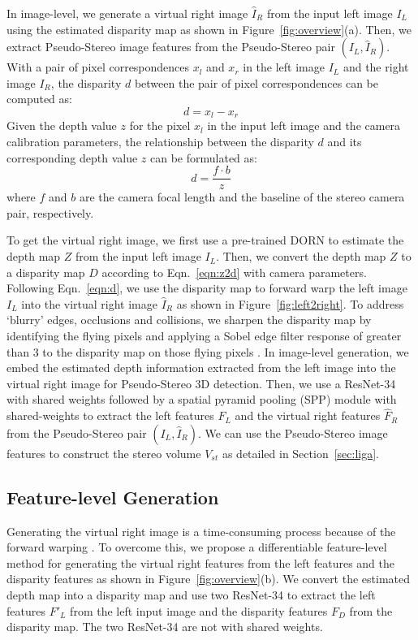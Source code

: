 \documentclass[10pt,twocolumn,letterpaper]{article}
\begin{document}
In image-level, we generate a virtual right image $\hat{I}_R$ from the input left image ${I}_L$ using the estimated disparity map as shown in Figure~\ref{fig:overview}(a). Then, we extract Pseudo-Stereo image features from the Pseudo-Stereo pair $({I}_L, \hat{I}_R)$. 
With a pair of pixel correspondences $x_l$ and $x_r$ in the left image $I_L$ and the right image $I_R$,  
the disparity $d$ between the pair of pixel correspondences can be computed as:
\begin{equation}\label{eqn:d}
d = x_l - x_r
\end{equation}
Given the depth value $z$ for the pixel $x_l$ in the input left image and the camera calibration parameters,
the relationship between the disparity $d$ and its corresponding depth value $z$ can be formulated as:
\begin{equation}\label{eqn:z2d}
d = \frac{f \cdot b}{z}
\end{equation}
where $f$ and $b$ are the camera focal length and the baseline of the stereo camera pair, respectively.

To get the virtual right image, we first use a pre-trained DORN \cite{fu2018deep} to estimate the depth map $Z$ from the input left image $I_L$. Then, we convert the depth map $Z$ to a disparity map $D$ according to Eqn.~\ref{eqn:z2d} with camera parameters. Following Eqn.~\ref{eqn:d}, we use the disparity map to forward warp the left image $I_L$ \cite{schwarz2007non} into the virtual right image $\hat{I}_R$ as shown in Figure~\ref{fig:left2right}. To address ‘blurry’ edges, occlusions and collisions, we sharpen the disparity map by identifying the flying pixels and applying a Sobel edge filter response of greater than 3 to the disparity map on those flying pixels \cite{hu2019revisiting,watson2020learning}. In image-level generation, we embed the estimated depth information extracted from the left image into the virtual right image for Pseudo-Stereo 3D detection. Then, we use a ResNet-34 \cite{he2016deep} with shared weights followed by a spatial pyramid pooling (SPP) module with shared-weights to extract the left features $F_L$ and the virtual right features $\hat{F}_R$ from the Pseudo-Stereo pair $({I}_L, \hat{I}_R)$. We can use the Pseudo-Stereo image features to construct the stereo volume $V_{st}$ as detailed in Section~\ref{sec:liga}.   

\subsection{Feature-level Generation}\label{sec:img2feat}
Generating the virtual right image is a time-consuming process because of the forward warping \cite{hu2019revisiting,watson2020learning}. To overcome this, we propose a differentiable feature-level method for generating the virtual right features from the left features and the disparity features as shown in Figure~\ref{fig:overview}(b). We convert the estimated depth map into a disparity map and use two ResNet-34 \cite{he2016deep} to extract the left features $F'_L$ from the left input image and the disparity features $F_D$ from the disparity map. The two ResNet-34 are not with shared weights. 
\end{document}
